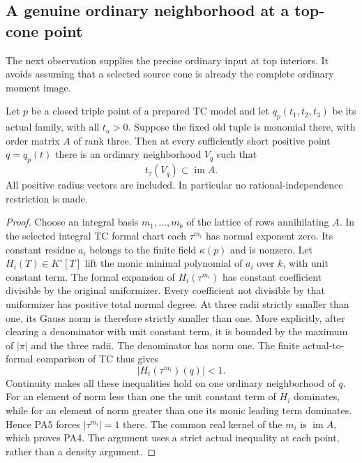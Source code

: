 \subsection{A genuine ordinary neighborhood at a top-cone point}

The next observation supplies the precise ordinary input at top
interiors.  It avoids assuming that a selected source cone is
already the complete ordinary moment image.

\begin{lemma}
\label{lem:r13-top-plane-ordinary-containment}
Let $p$ be a closed triple point of a prepared TC model and let
$q_p(t_1,t_2,t_3)$ be its actual family, with all $t_a>0$.
Suppose the fixed old tuple is monomial there, with order matrix
$A$ of rank three.  Then at every sufficiently short positive
point $q=q_p(t)$ there is an ordinary neighborhood $V_q$ such
that
\[
                         t_\tau(V_q)\subset\operatorname{im}A.
 \tag{PA4}
\]
All positive radius vectors are included.  In particular no
rational-independence restriction is made.
\end{lemma}

\begin{proof}
Choose an integral basis $m_1,\ldots,m_b$ of the lattice of
rows annihilating $A$.  In the selected integral TC formal
chart each $\tau^{m_i}$ has normal exponent zero.  Its
constant residue $a_i$ belongs to the finite field
$\kappa(p)$ and is nonzero.  Let $H_i(T)\in K^\circ[T]$
lift the monic minimal polynomial of $a_i$ over $k$, with
unit constant term.  The formal expansion of
$H_i(\tau^{m_i})$ has constant coefficient divisible by
the original uniformizer.  Every coefficient not divisible
by that uniformizer has positive total normal degree.
At three radii strictly smaller than one, its Gauss norm
is therefore strictly smaller than one.  More explicitly,
after clearing a denominator with unit constant term, it
is bounded by the maximum of $|\pi|$ and the three radii.
The denominator has norm one.  The finite actual-to-formal
comparison of TC thus gives
\[
                  |H_i(\tau^{m_i})(q)|<1.
 \tag{PA5}
\]
Continuity makes all these inequalities hold on one ordinary
neighborhood of $q$.  For an element of norm less than one
the unit constant term of $H_i$ dominates, while for an
element of norm greater than one its monic leading term
dominates.  Hence PA5 forces $|\tau^{m_i}|=1$ there.
The common real kernel of the $m_i$ is $\operatorname{im}A$,
which proves PA4.  The argument uses a strict actual
inequality at each point, rather than a density argument.
\end{proof}

